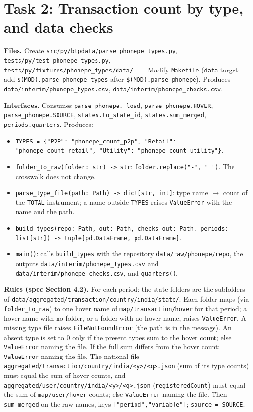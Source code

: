 \documentclass[10pt,a4paper]{article}
\newcommand{\f}[1]{\texttt{#1}}
\begin{document}
\section{Task 2: Transaction count by type, and data checks}
\textbf{Files.} Create \f{src/py/btpdata/parse\_phonepe\_types.py}, \f{tests/py/test\_phonepe\_types.py},
\f{tests/py/fixtures/phonepe\_types/data/...}. Modify \f{Makefile} (\f{data} target: add
\f{\$(MOD).parse\_phonepe\_types} after \f{\$(MOD).parse\_phonepe}). Produces \f{data/interim/phonepe\_types.csv},
\f{data/interim/phonepe\_checks.csv}.

\textbf{Interfaces.} Consumes \f{parse\_phonepe.\_load}, \f{parse\_phonepe.HOVER}, \f{parse\_phonepe.SOURCE},
\f{states.to\_state\_id}, \f{states.sum\_merged}, \f{periods.quarters}. Produces:
\begin{itemize}
\item \f{TYPES = \{"P2P": "phonepe\_count\_p2p", "Retail": "phonepe\_count\_retail", "Utility": "phonepe\_count\_utility"\}}.
\item \f{folder\_to\_raw(folder: str) -> str}: \f{folder.replace("-", " ")}. The crosswalk does not change.
\item \f{parse\_type\_file(path: Path) -> dict[str, int]}: type name $\to$ count of the \f{TOTAL} instrument;
      a name outside \f{TYPES} raises \f{ValueError} with the name and the path.
\item \f{build\_types(repo: Path, out: Path, checks\_out: Path, periods: list[str]) -> tuple[pd.DataFrame, pd.DataFrame]}.
\item \f{main()}: calls \f{build\_types} with the repository \f{data/raw/phonepe/repo}, the outputs
      \f{data/interim/phonepe\_types.csv} and \f{data/interim/phonepe\_checks.csv}, and \f{quarters()}.
\end{itemize}

\textbf{Rules (spec Section 4.2).} For each period: the state folders are the subfolders of
\f{data/aggregated/transaction/country/india/state/}. Each folder maps (via \f{folder\_to\_raw}) to one hover name of
\f{map/transaction/hover} for that period; a hover name with no folder, or a folder with no hover name, raises
\f{ValueError}. A missing type file raises \f{FileNotFoundError} (the path is in the message). An absent type is
set to 0 only if the present types sum to the hover count; else \f{ValueError} naming the file. If the full sum
differs from the hover count: \f{ValueError} naming the file. The national file
\f{aggregated/transaction/country/india/<y>/<q>.json} (sum of its type counts) must equal the sum of hover counts,
and \f{aggregated/user/country/india/<y>/<q>.json} (\f{registeredCount}) must equal the sum of
\f{map/user/hover} counts; else \f{ValueError} naming the file. Then \f{sum\_merged} on the raw names, keys
\f{["period","variable"]}; \f{source = SOURCE}.
\end{document}
